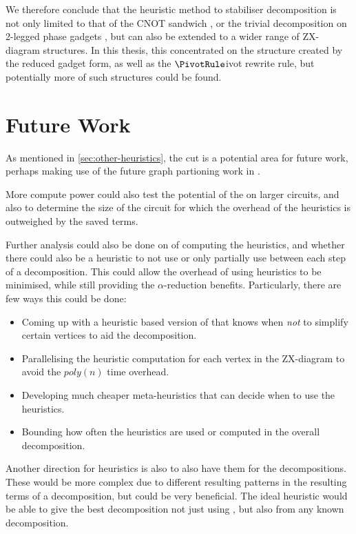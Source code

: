 We therefore conclude that the heuristic method to stabiliser decomposition
is not only limited to that of the CNOT sandwich \cite{sutcliffe2024proccut},
or the trivial \CutRule decomposition on 2-legged phase gadgets \cite{Codsi2022},
but can also be extended to a wider range of ZX-diagram structures.
In this thesis, this concentrated on the structure created by the reduced gadget form,
as well as the $\PivotRule$ivot rewrite rule,
but potentially more of such structures could be found.


\section{Future Work}

As mentioned in \autoref{sec:other-heuristics}, the  cut
is a potential area for future work, 
perhaps making use of the future graph partioning work in \cite{sutcliffe2024part}.

More compute power could also test the potential of the 
on larger circuits, and also to determine the size of the circuit for which the overhead of the heuristics
is outweighed by the saved terms.

Further analysis could also be done on  of computing the heuristics,
and whether there could also be a heuristic to not use or only partially use 
between each step of a decomposition.
This could allow the overhead of using heuristics to be minimised,
while still providing the $\alpha$-reduction benefits.
Particularly, there are few ways this could be done:
\begin{itemize}
    \item Coming up with a heuristic based version of  
    that knows when \textit{not} to simplify certain vertices to aid the \CutRule decomposition.
    \item Parallelising the heuristic computation for each vertex in the ZX-diagram to avoid 
    the $poly(n)$ time overhead.
    \item Developing much cheaper meta-heuristics that can decide when to use the heuristics.
    \item Bounding how often the heuristics are used or computed in the overall decomposition.
\end{itemize}

Another direction for heuristics is also to also have them for the  decompositions.
These would be more complex due to different resulting patterns in the resulting terms of a decomposition,
but could be very beneficial.
The ideal heuristic would be able to give the best decomposition not just using \CutRule,
but also from any known decomposition.


